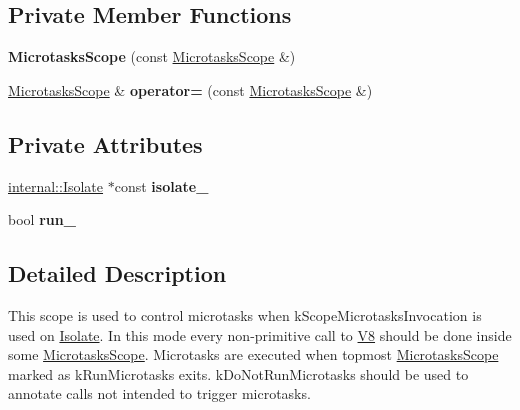 \subsection*{Private Member Functions}
\begin{DoxyCompactItemize}
\item 
{\bfseries Microtasks\+Scope} (const \hyperlink{classv8_1_1_microtasks_scope}{Microtasks\+Scope} \&)\hypertarget{classv8_1_1_microtasks_scope_a393a4ab5a2737ca8dc64d37bfffbc50b}{}\label{classv8_1_1_microtasks_scope_a393a4ab5a2737ca8dc64d37bfffbc50b}

\item 
\hyperlink{classv8_1_1_microtasks_scope}{Microtasks\+Scope} \& {\bfseries operator=} (const \hyperlink{classv8_1_1_microtasks_scope}{Microtasks\+Scope} \&)\hypertarget{classv8_1_1_microtasks_scope_aa50f4629682aa6ae194f230e1f6f7743}{}\label{classv8_1_1_microtasks_scope_aa50f4629682aa6ae194f230e1f6f7743}

\end{DoxyCompactItemize}
\subsection*{Private Attributes}
\begin{DoxyCompactItemize}
\item 
\hyperlink{classv8_1_1internal_1_1_isolate}{internal\+::\+Isolate} $\ast$const {\bfseries isolate\+\_\+}\hypertarget{classv8_1_1_microtasks_scope_a712ddabc8187fd73fad07c96127066f1}{}\label{classv8_1_1_microtasks_scope_a712ddabc8187fd73fad07c96127066f1}

\item 
bool {\bfseries run\+\_\+}\hypertarget{classv8_1_1_microtasks_scope_ab05a25efd19e42e557d83a511c2283d6}{}\label{classv8_1_1_microtasks_scope_ab05a25efd19e42e557d83a511c2283d6}

\end{DoxyCompactItemize}


\subsection{Detailed Description}
This scope is used to control microtasks when k\+Scope\+Microtasks\+Invocation is used on \hyperlink{classv8_1_1_isolate}{Isolate}. In this mode every non-\/primitive call to \hyperlink{classv8_1_1_v8}{V8} should be done inside some \hyperlink{classv8_1_1_microtasks_scope}{Microtasks\+Scope}. Microtasks are executed when topmost \hyperlink{classv8_1_1_microtasks_scope}{Microtasks\+Scope} marked as k\+Run\+Microtasks exits. k\+Do\+Not\+Run\+Microtasks should be used to annotate calls not intended to trigger microtasks. 

